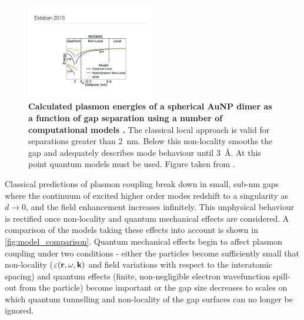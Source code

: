 \documentclass{article}
\begin{document}
\begin{figure}[bt]
\centering
\includegraphics[width=0.5\textwidth]{figures/literature/esteban2015a}
\caption[Calculated plasmon energies of a spherical AuNP dimer as a function of gap separation using a number of computational models \cite{esteban2015}]{\textbf{Calculated plasmon energies of a spherical AuNP dimer as a function of gap separation using a number of computational models \cite{esteban2015}.} The classical local approach is valid for separations greater than \SI{2}{nm}. Below this non-locality smooths the gap and adequately describes mode behaviour until \SI{3}{\angstrom}. At this point quantum models must be used. Figure taken from \cite{esteban2015}.}
\label{fig:model_comparison}
\end{figure}

Classical predictions of plasmon coupling break down in small, sub-nm gaps where the continuum of excited higher order modes redshift to a singularity as $d\rightarrow0$, and the field enhancement increases infinitely. This unphysical behaviour is rectified once non-locality and quantum mechanical effects are considered. A comparison of the models taking these effects into account is shown in \autoref{fig:model_comparison}. Quantum mechanical effects begin to affect plasmon coupling under two conditions - either the particles become sufficiently small that non-locality ($\varepsilon(\mathbf{r}, \omega, \mathbf{k})$ and field variations with respect to the interatomic spacing) and quantum effects (finite, non-negligible electron wavefunction spill-out from the particle) become important or the gap size decreases to scales on which quantum tunnelling and non-locality of the gap surfaces can no longer be ignored.
\end{document}
